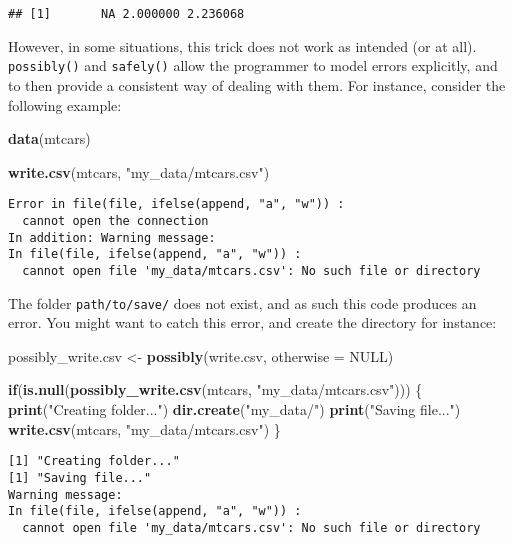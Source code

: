 \documentclass[
]{article}
\newenvironment{Shaded}{\begin{snugshade}}{\end{snugshade}}
\newcommand{\ControlFlowTok}[1]{\textcolor[rgb]{0.13,0.29,0.53}{\textbf{#1}}}
\newcommand{\DataTypeTok}[1]{\textcolor[rgb]{0.13,0.29,0.53}{#1}}
\newcommand{\KeywordTok}[1]{\textcolor[rgb]{0.13,0.29,0.53}{\textbf{#1}}}
\newcommand{\NormalTok}[1]{#1}
\newcommand{\OtherTok}[1]{\textcolor[rgb]{0.56,0.35,0.01}{#1}}
\newcommand{\StringTok}[1]{\textcolor[rgb]{0.31,0.60,0.02}{#1}}
\begin{document}
\begin{verbatim}
## [1]       NA 2.000000 2.236068
\end{verbatim}

However, in some situations, this trick does not work as intended (or at all). \texttt{possibly()} and
\texttt{safely()} allow the programmer to model errors explicitly, and to then provide a consistent way
of dealing with them. For instance, consider the following example:

\begin{Shaded}
\begin{Highlighting}[]
\KeywordTok{data}\NormalTok{(mtcars)}

\KeywordTok{write.csv}\NormalTok{(mtcars, }\StringTok{"my\_data/mtcars.csv"}\NormalTok{)}
\end{Highlighting}
\end{Shaded}

\begin{verbatim}
Error in file(file, ifelse(append, "a", "w")) : 
  cannot open the connection
In addition: Warning message:
In file(file, ifelse(append, "a", "w")) :
  cannot open file 'my_data/mtcars.csv': No such file or directory
\end{verbatim}

The folder \texttt{path/to/save/} does not exist, and as such this code produces an error. You might
want to catch this error, and create the directory for instance:

\begin{Shaded}
\begin{Highlighting}[]
\NormalTok{possibly\_write.csv \textless{}{-}}\StringTok{ }\KeywordTok{possibly}\NormalTok{(write.csv, }\DataTypeTok{otherwise =} \OtherTok{NULL}\NormalTok{)}

\ControlFlowTok{if}\NormalTok{(}\KeywordTok{is.null}\NormalTok{(}\KeywordTok{possibly\_write.csv}\NormalTok{(mtcars, }\StringTok{"my\_data/mtcars.csv"}\NormalTok{))) \{}
  \KeywordTok{print}\NormalTok{(}\StringTok{"Creating folder..."}\NormalTok{)}
  \KeywordTok{dir.create}\NormalTok{(}\StringTok{"my\_data/"}\NormalTok{)}
  \KeywordTok{print}\NormalTok{(}\StringTok{"Saving file..."}\NormalTok{)}
  \KeywordTok{write.csv}\NormalTok{(mtcars, }\StringTok{"my\_data/mtcars.csv"}\NormalTok{)}
\NormalTok{\}}
\end{Highlighting}
\end{Shaded}

\begin{verbatim}
[1] "Creating folder..."
[1] "Saving file..."
Warning message:
In file(file, ifelse(append, "a", "w")) :
  cannot open file 'my_data/mtcars.csv': No such file or directory
\end{verbatim}
\end{document}

